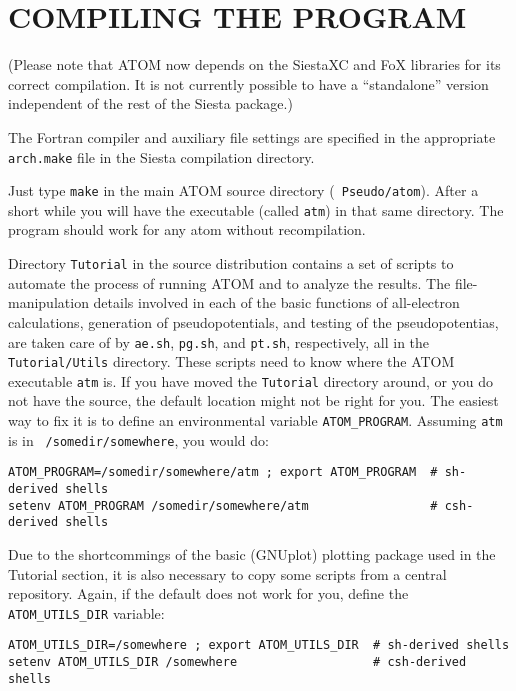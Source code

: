 \documentclass[11pt]{article}
\begin{document}
\section{COMPILING THE PROGRAM}

(Please note that {\sc ATOM} now depends on the SiestaXC and FoX libraries
for its correct compilation. It is not currently possible to have
a ``standalone'' version independent of the rest of the Siesta package.)

The Fortran compiler and auxiliary file settings are specified in the
appropriate {\tt arch.make} file in the Siesta compilation directory.

Just type {\tt make} in the main {\sc ATOM} source directory ({\tt
Pseudo/atom}). After a short while you will have the executable (called
{\tt atm}) in that same directory. The program should work for any atom
without recompilation. 

Directory {\tt Tutorial} in the source distribution contains a set of
scripts to automate the process of running {\sc ATOM} and to analyze
the results. The file-manipulation details involved in each of the
basic functions of all-electron calculations, generation of
pseudopotentials, and testing of the pseudopotentias, are taken care
of by {\tt ae.sh}, {\tt pg.sh}, and {\tt pt.sh}, respectively, all in
the {\tt Tutorial/Utils} directory.  These
scripts need to know where the {\sc ATOM} executable {\tt atm}
is. If you have moved the {\tt Tutorial} directory around, or you do
not have the source, the default location might not be right for you.
The easiest way to fix it is to define an environmental
variable {\tt ATOM\_PROGRAM}. Assuming {\tt atm} is in {\tt
/somedir/somewhere}, you would do:
%
\begin{verbatim}
ATOM_PROGRAM=/somedir/somewhere/atm ; export ATOM_PROGRAM  # sh-derived shells
setenv ATOM_PROGRAM /somedir/somewhere/atm                 # csh-derived shells
\end{verbatim}
%

Due to the shortcommings of the basic (GNUplot) plotting package used in the
Tutorial section, it is also necessary to copy some scripts from a
central repository. Again, if the default does not work for you,
define the {\tt ATOM\_UTILS\_DIR} variable:

\begin{verbatim}
ATOM_UTILS_DIR=/somewhere ; export ATOM_UTILS_DIR  # sh-derived shells
setenv ATOM_UTILS_DIR /somewhere                   # csh-derived shells
\end{verbatim}
%
\end{document}
